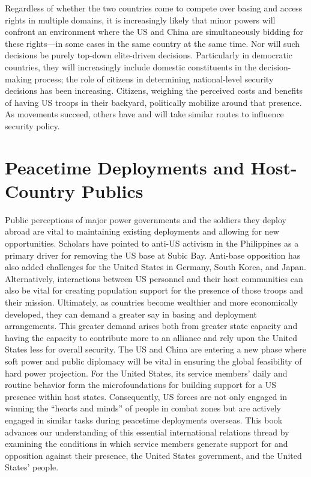 Regardless of whether the two countries come to compete over basing and access rights in multiple domains, it is increasingly likely that minor powers will confront an environment where the US and China are simultaneously bidding for these rights---in some cases in the same country at the same time.\autocite{Campbell2019} Nor will such decisions be purely top-down elite-driven decisions. Particularly in democratic countries, they will increasingly include domestic constituents in the decision-making process; the role of citizens in determining national-level security decisions has been increasing.\autocite{GoldsmithHoriuchi2012} Citizens, weighing the perceived costs and benefits of having US troops in their backyard, politically mobilize around that presence. As movements succeed, others have and will take similar routes to influence security policy. 

\section*{Peacetime Deployments and Host-Country Publics}

Public perceptions of major power governments and the soldiers they deploy abroad are vital to maintaining existing deployments and allowing for new opportunities. Scholars have pointed to anti-US activism in the Philippines as a primary driver for removing the US base at Subic Bay.\autocite{simbulan2009} Anti-base opposition has also added challenges for the United States in Germany, South Korea, and Japan. Alternatively, interactions between US personnel and their host communities can also be vital for creating population support for the presence of those troops and their mission.\autocite{Allen2020} Ultimately, as countries become wealthier and more economically developed, they can demand a greater say in basing and deployment arrangements. This greater demand arises both from greater state capacity and having the capacity to contribute more to an alliance and rely upon the United States less for overall security.\autocite{Lake2009a}  The US and China are entering a new phase where soft power and public diplomacy will be vital in ensuring the global feasibility of hard power projection. For the United States, its service members' daily and routine behavior form the microfoundations for building support for a US presence within host states. Consequently, US forces are not only engaged in winning the ``hearts and minds'' of people in combat zones but are actively engaged in similar tasks during peacetime deployments overseas. This book advances our understanding of this essential international relations thread by examining the conditions in which service members generate support for and opposition against their presence, the United States government, and the United States' people.  


